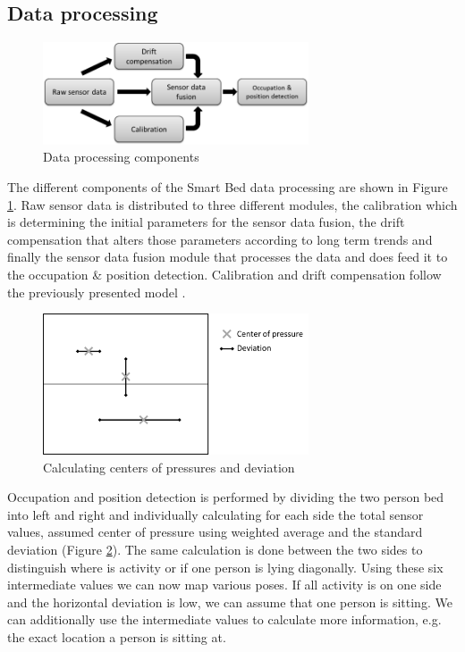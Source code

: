 \subsection{Data processing}
\begin{figure}[h]
\centering
\includegraphics[width=0.7\textwidth]{images/smartbed_proc}
\caption{Data processing components \cite{braun2012context}}
\label{fig:smartbed_proc}
\end{figure}
The different components of the Smart Bed data processing are shown in Figure \ref{fig:smartbed_proc}. Raw sensor data is distributed to three different modules, the calibration which is determining the initial parameters for the sensor data fusion, the drift compensation that alters those parameters according to long term trends and finally the sensor data fusion module that processes the data and does feed it to the occupation \& position detection. Calibration and drift compensation follow the previously presented model \cite{braun2012context}. 
\begin{figure}[h]
\centering
\includegraphics[width=0.7\textwidth]{images/smartbed_cog}
\caption{Calculating centers of pressures and deviation \cite{braun2012context}}
\label{fig:smartbed_cog}
\end{figure}
Occupation and position detection is performed by dividing the two person bed into left and right and individually calculating for each side the total sensor values, assumed center of pressure using weighted average and the standard deviation (Figure \ref{fig:smartbed_cog}). The same calculation is done between the two sides to distinguish where is activity or if one person is lying diagonally.
Using these six intermediate values we can now map various poses. If all activity is on one side and the horizontal deviation is low, we can assume that one person is sitting. We can additionally use the intermediate values to calculate more information, e.g. the exact location a person is sitting at. 
